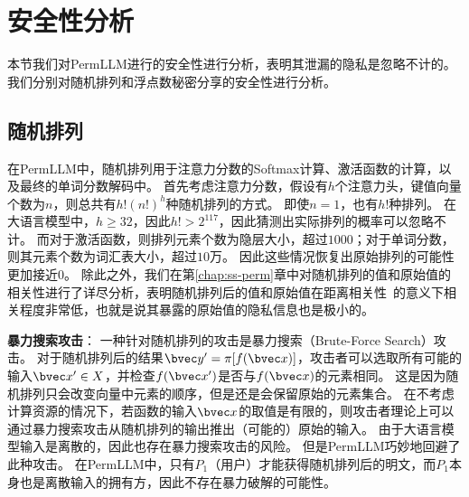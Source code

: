 \section{安全性分析}
本节我们对PermLLM进行的安全性进行分析，表明其泄漏的隐私是忽略不计的。
%
我们分别对随机排列和浮点数秘密分享的安全性进行分析。


\subsection{随机排列}
在PermLLM中，随机排列用于注意力分数的Softmax计算、激活函数的计算，以及最终的单词分数解码中。
%
首先考虑注意力分数，假设有$h$个注意力头，键值向量个数为$n$，则总共有$h!(n!)^h$种随机排列的方式。
即使$n=1$，也有$h!$种排列。
在大语言模型中，$h \ge 32$，因此$h! > 2^{117}$，因此猜测出实际排列的概率可以忽略不计。
%
而对于激活函数，则排列元素个数为隐层大小，超过$1000$；对于单词分数，则其元素个数为词汇表大小，超过$10$万。
因此这些情况恢复出原始排列的可能性更加接近0。
%
除此之外，我们在第\ref{chap:ss-perm}章中对随机排列的值和原始值的相关性进行了详尽分析，表明随机排列后的值和原始值在距离相关性~\cite{szekely2007dcor}的意义下相关程度非常低，也就是说其暴露的原始值的隐私信息也是极小的。


\textbf{暴力搜索攻击}：
一种针对随机排列的攻击是暴力搜索（Brute-Force Search）攻击。
对于随机排列后的结果$\bvec y' = \pi[f(\bvec x)]$，攻击者可以选取所有可能的输入$\bvec x' \in X$，并检查$f(\bvec x')$是否与$f(\bvec x)$的元素相同。
这是因为随机排列只会改变向量中元素的顺序，但是还是会保留原始的元素集合。
在不考虑计算资源的情况下，若函数的输入$\bvec x$的取值是有限的，则攻击者理论上可以通过暴力搜索攻击从随机排列的输出推出（可能的）原始的输入。
%
由于大语言模型输入是离散的，因此也存在暴力搜索攻击的风险。
但是PermLLM巧妙地回避了此种攻击。
%
在PermLLM中，只有$P_1$（用户）才能获得随机排列后的明文，而$P_1$本身也是离散输入的拥有方，因此不存在暴力破解的可能性。

